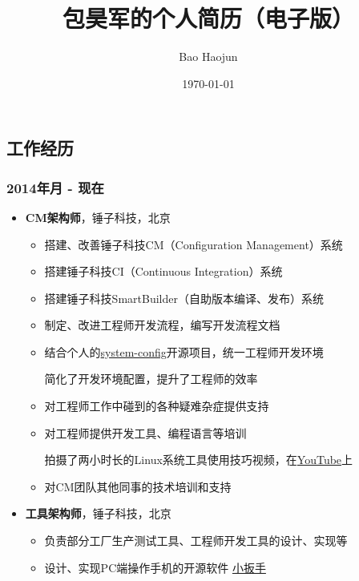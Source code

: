 \documentclass[11pt,dvipdfmx,CJKbookmarks]{article}
\author{Bao Haojun}
\date{\today}
\title{包昊军的个人简历（电子版）}
\begin{document}
\begin{CJK*}{UTF8}{simsun}

\maketitle



\section{工作经历}
\label{sec-1}
\subsubsection{2014\thinspace 年\thinspace 月 - 现在}
\label{sec-1-0-1}
\begin{itemize}
\item \textbf{CM\thinspace 架构师}，锤子科技，北京
\begin{itemize}
\item 搭建、改善锤子科技\thinspace CM（Configuration Management）系统
\item 搭建锤子科技\thinspace CI（Continuous Integration）系统
\item 搭建锤子科技\thinspace SmartBuilder（自助版本编译、发布）系统
\item 制定、改进工程师开发流程，编写开发流程文档
\item 结合个人的\thinspace \href{https://github.com/baohaojun/system-config}{system-config}\thinspace 开源项目，统一工程师开发环境

简化了开发环境配置，提升了工程师的效率

\item 对工程师工作中碰到的各种疑难杂症提供支持
\item 对工程师提供开发工具、编程语言等培训

拍摄了两小时长的\thinspace Linux\thinspace 系统工具使用技巧视频，在\thinspace \href{https://www.youtube.com/watch?v\%3Dqp2b3-Guej0}{YouTube}\thinspace 上

\item 对\thinspace CM\thinspace 团队其他同事的技术培训和支持
\end{itemize}

\item \textbf{工具架构师}，锤子科技，北京

\begin{itemize}
\item 负责部分工厂生产测试工具、工程师开发工具的设计、实现等
\item 设计、实现\thinspace PC\thinspace 端操作手机的开源软件 \href{https://github.com/SmartisanTech/Wrench}{小扳手}


\end{itemize}
\end{itemize}
\end{CJK*}
\end{document}
